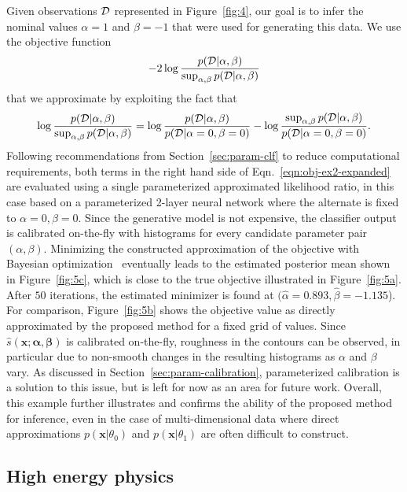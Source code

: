 \documentclass[12pt]{article}
\numberwithin{equation}{section}
\theoremstyle{plain}
\begin{document}
Given observations ${\cal D}$ represented in Figure~\ref{fig:4},
our goal is to infer the nominal values $\alpha=1$ and $\beta=-1$ that
were used for generating this data.
We use the objective function
\begin{equation}\label{eqn:obj-ex2}
    -2 \log \frac{p({\cal D} | \alpha, \beta)}{ \sup_{\alpha,\beta} p({\cal D} | \alpha, \beta) }
\end{equation}
that we approximate by exploiting the fact that
\begin{equation}\label{eqn:obj-ex2-expanded}
\log \frac{p({\cal D} | \alpha, \beta)}{ \sup_{\alpha,\beta} p({\cal D} | \alpha, \beta) } = \log \frac{p({\cal D} | \alpha, \beta)}{ p({\cal D} | \alpha=0, \beta=0) } - \log \frac{ \sup_{\alpha,\beta} p({\cal D} | \alpha, \beta) }{ p({\cal D} | \alpha=0, \beta=0)}.
\end{equation}
Following recommendations from Section~\ref{sec:param-clf} to reduce
computational requirements, both terms in the right hand side of Eqn.~\ref{eqn:obj-ex2-expanded} are evaluated using a single
parameterized approximated  likelihood ratio, in this case based on a parameterized
2-layer neural network where the alternate is fixed to $\alpha=0, \beta=0$.
Since the generative model is not expensive, the classifier output is calibrated
on-the-fly with histograms for  every candidate parameter pair $(\alpha,\beta)$.
Minimizing the constructed approximation of the objective with
Bayesian optimization~\citep{brochu2010tutorial} eventually leads to the
estimated posterior mean shown in Figure~\ref{fig:5c}, which is close to the
true objective illustrated in Figure~\ref{fig:5a}. After $50$ iterations, the
estimated minimizer is found at $(\hat \alpha=0.893, \hat \beta=-1.135$). For
comparison, Figure~\ref{fig:5b} shows the objective value as directly
approximated by the proposed method for a fixed grid of values. Since $\hat s(\mathbf{x;\alpha,\beta})$ is calibrated on-the-fly,
roughness in the contours can be observed, in particular due to non-smooth changes in the resulting histograms as $\alpha$ and $\beta$ vary.
As discussed in Section~\ref{sec:param-calibration}, parameterized calibration
is a solution to this issue, but is left for now as an area for future work.
Overall, this example further illustrates and confirms the ability
of the proposed method for inference, even in the case of multi-dimensional data where
direct approximations $p(\mathbf{x}|\theta_0)$ and $p(\mathbf{x}|\theta_1)$
are often difficult to construct.


\subsection{High energy physics}
\end{document}
